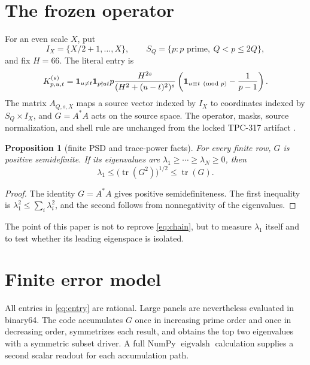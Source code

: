 \documentclass[10pt]{article}
\newtheorem{proposition}{Proposition}
\newcommand{\tr}{\operatorname{tr}}
\begin{document}
\section{The frozen operator}

For an even scale $X$, put
\[
 I_X=\{X/2+1,\ldots,X\},\qquad
 S_Q=\{p: p\text{ prime},\ Q<p\leq 2Q\},
\]
and fix $H=66$.  The literal entry is
\begin{equation}
 K_{p,u,t}^{(s)}={\bf 1}_{u\ne t}{\bf 1}_{p\nmid ut}
 p\frac{H^{2s}}{(H^2+(u-t)^2)^s}
 \left({\bf 1}_{u\equiv t\pmod p}-\frac1{p-1}\right).
 \label{eq:entry}
\end{equation}
The matrix $A_{Q,s,X}$ maps a source vector indexed by $I_X$ to coordinates
indexed by $S_Q\times I_X$, and $G=A^*A$ acts on the source space.  The
operator, masks, source normalization, and shell rule are unchanged from the
locked TPC-317 artifact \cite{tpc317}.

\begin{proposition}[finite PSD and trace-power facts]
For every finite row, $G$ is positive semidefinite.  If its eigenvalues are
$\lambda_1\geq\cdots\geq\lambda_N\geq0$, then
\[
 \lambda_1\leq\bigl(\tr(G^2)\bigr)^{1/2}\leq\tr(G).
 \label{eq:chain}
\]
\end{proposition}
\begin{proof}
The identity $G=A^*A$ gives positive semidefiniteness.  The first inequality
is $\lambda_1^2\leq\sum_i\lambda_i^2$, and the second follows from
nonnegativity of the eigenvalues.
\end{proof}

The point of this paper is not to reprove \eqref{eq:chain}, but to measure
$\lambda_1$ itself and to test whether its leading eigenspace is isolated.

\section{Finite error model}

All entries in \eqref{eq:entry} are rational.  Large panels are nevertheless
evaluated in binary64.  The code accumulates $G$ once in increasing prime order
and once in decreasing order, symmetrizes each result, and obtains the top two
eigenvalues with a symmetric subset driver.  A full NumPy $\operatorname{eigvalsh}$
calculation supplies a second scalar readout for each accumulation path.
\end{document}
